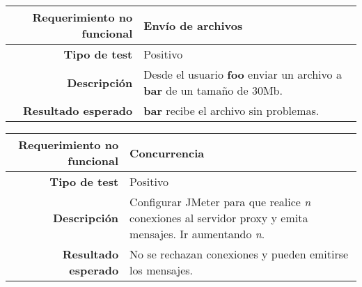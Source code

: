 \documentclass[a4paper,10pt]{article}
\begin{document}
\begin{center}
  \begin{tabular}{|r|p{12.5cm}|}
    \hline
    \textbf{Requerimiento no funcional}	& Envío de archivos\\
    \hline
    \textbf{Tipo de test}	&	Positivo\\
    \hline
    \textbf{Descripción}	&	Desde el usuario \textbf{foo} enviar un archivo a \textbf{bar} de un tamaño de 30Mb.\\
    \hline
    \textbf{Resultado esperado}	&	\textbf{bar} recibe el archivo sin problemas.\\
    \hline   
  \end{tabular}
\end{center}

\begin{center}
  \begin{tabular}{|r|p{12.5cm}|}
    \hline
    \textbf{Requerimiento no funcional}	& Concurrencia\\
    \hline
    \textbf{Tipo de test}	&	Positivo\\
    \hline
    \textbf{Descripción}	&	Configurar JMeter para que realice \textit{n} conexiones al servidor proxy y emita mensajes.
					Ir aumentando \textit{n}.\\
    \hline
    \textbf{Resultado esperado}	&	No se rechazan conexiones y pueden emitirse los mensajes.\\
    \hline   
  \end{tabular}
\end{center}
\end{document}
